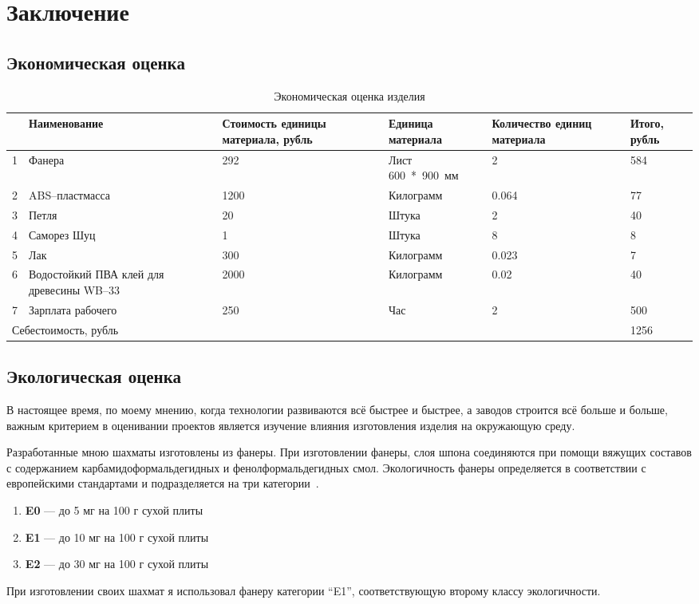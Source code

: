 \section{Заключение}
\subsection{Экономическая оценка}
\begin{table}[H]
    \centering
    \caption{Экономическая оценка изделия}\label{tab:economic}
    \vspace{1em}
    \begin{tabular}{p{1.1em} p{9em} p{5em} p{6em} p{6em} p{3em}}
    \toprule
     & Наименование & Стоимость единицы материала, рубль & Единица
    \mbox{материала} & Количество единиц материала & Итого, рубль \\
    \midrule
    1 & Фанера & 292 & Лист \mbox{600 * 900 мм} & 2 & 584 \\
    \midrule
    2 & ABS--пластмасса & 1200 & Килограмм & 0.064 & 77 \\
    \midrule
    3 & Петля & 20 & Штука & 2 & 40 \\
    \midrule
    4 & Саморез Шуц & 1 & Штука & 8 & 8 \\
    \midrule
    5 & Лак & 300 & Килограмм & 0.023 & 7 \\
    \midrule
    6 & Водостойкий ПВА клей для древесины WB--33 & 2000 & Килограмм & 0.02 & 40 \\
    \midrule
    7 & Зарплата рабочего & 250 & Час & 2 & 500 \\
    \bottomrule
    \multicolumn{5}{l}{Себестоимость, рубль} & 1256 \\
    \bottomrule
    \end{tabular}
\end{table}

\subsection{Экологическая оценка}
В настоящее время, по моему мнению, когда технологии развиваются всё быстрее и
быстрее, а заводов строится всё больше и больше, важным критерием в оценивании
проектов является изучение влияния изготовления изделия на окружающую среду.

Разработанные мною шахматы изготовлены из фанеры. При изготовлении фанеры, слоя
шпона соединяются при помощи вяжущих составов с содержанием
карбамидоформальдегидных и фенолформальдегидных смол. Экологичность фанеры
определяется в соответствии с европейскими стандартами и подразделяется на три
категории~\cite{web:merani}.
\begin{enumerate}
    \item \textbf{E0} --- до 5 мг на 100 г сухой плиты
    \item \textbf{E1} --- до 10 мг на 100 г сухой плиты
    \item \textbf{E2} --- до 30 мг на 100 г сухой плиты
\end{enumerate}
При изготовлении своих шахмат я использовал фанеру категории ``E1'',
соответствующую второму классу экологичности.

